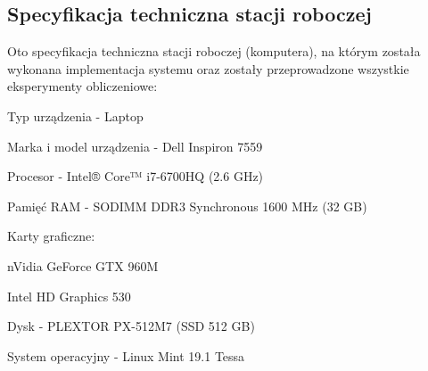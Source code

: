 \subsection{Specyfikacja techniczna stacji roboczej}
Oto specyfikacja techniczna stacji roboczej (komputera), na którym została wykonana implementacja systemu oraz zostały przeprowadzone wszystkie eksperymenty obliczeniowe:
\begin{enumerate*}
\item Typ urządzenia - Laptop
\item Marka i model urządzenia - Dell Inspiron 7559 \cite{dellInspiron:specs}
\item Procesor - Intel® Core™ i7-6700HQ (2.6 GHz) \cite{intelCpu:specs}
\item Pamięć RAM - SODIMM DDR3 Synchronous 1600 MHz (32 GB)
\item Karty graficzne:
\begin{itemize*}
\item nVidia GeForce GTX 960M \cite{nvidiaGPU:specs}
\item Intel HD Graphics 530
\end{itemize*}
\item Dysk - PLEXTOR PX-512M7 (SSD 512 GB)
\item System operacyjny - Linux Mint 19.1 Tessa
\end{enumerate*}
